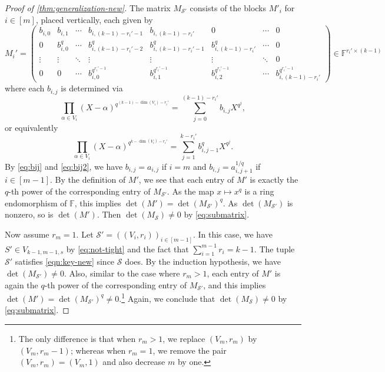 \documentclass[11pt]{article}
\theoremstyle{plain}
\theoremstyle{definition}
\theoremstyle{remark}
\newcommand{\F}{\mathbb{F}}
\newcommand{\cS}{\mathcal{S}}
\begin{document}
\begin{proof}[Proof of \cref{thm:generalization-new}]
The matrix $M_{\cS'}$ consists of the blocks $M'_i$ for $i\in [m]$, placed vertically, each given by
\[
M_i'=\begin{pmatrix}
b_{i,0}&b_{i,1}&\cdots& b_{i,(k-1)-r_i'-1} & b_{i,(k-1)-r_i'}&  0 & \cdots &0   \\
0 &b_{i,0}^q& \cdots  & b_{i,(k-1)-r_i'-2}^q & b_{i,(k-1)-r_i'-1}^q & b_{i,(k-1)-r_i'}^q & \cdots &0 \\
\vdots & \vdots &\ddots & \vdots &\vdots &\vdots& \ddots &0\\
0 &0  & \cdots &b_{i,0}^{q^{r_i'-1}} & b_{i,1}^{q^{r_i'-1}} & b_{i,2}^{q^{r_i'-1}} &\cdots & b_{i,(k-1)-r_i'}^{q^{r_i'-1}} 
\end{pmatrix}\in\mathbb{F}^{r_i'\times (k-1)}
\]
where each $b_{i,j}$ is determined via 
\begin{equation}\label{eq:bij}
\prod_{\alpha\in V_i}(X-\alpha)^{q^{(k-1)-\dim(V_i)-r_i'}}=\sum_{j=0}^{(k-1)-r_i'}b_{i,j} X^{q^j},
\end{equation}
or equivalently
\begin{equation}\label{eq:bij2}
\prod_{\alpha\in V_i}(X-\alpha)^{q^{k-\dim(V_i)-r_i'}}=\sum_{j=1}^{k-r_i'}b_{i,j-1}^q X^{q^j}.
\end{equation}
By \eqref{eq:bij} and \eqref{eq:bij2}, we have $b_{i,j}=a_{i,j}$ if $i=m$ and $b_{i,j}=a_{i,j+1}^{1/q}$ if $i\in [m-1]$. By the definition of $M'$, we see that each entry of $M'$ is exactly the $q$-th power of the corresponding entry of $M_{\cS'}$. As the map $x\mapsto x^q$ is a ring endomorphism of $\F$, this implies $\det(M')=\det(M_{\cS'})^q$.
As $\det(M_{\cS'})$ is nonzero, so is $\det(M')$.
Then $\det(M_{\cS})\neq 0$ by \eqref{eq:submatrix}.




Now assume $r_m=1$. Let $\cS'=((V_i, r_i))_{i\in [m-1]}$. In this case, we have $S'\in V_{k-1,m-1,s}$ by \eqref{eq:not-tight} and the fact that $\sum_{i=1}^{m-1} r_i=k-1$. 
The tuple $\cS'$ satisfies \eqref{eqn:key-new} since $\cS$ does. By the induction hypothesis, we have $\det(M_{\cS'})\neq 0$.
Also, similar to the case where $r_m>1$, each entry of $M'$ is again the $q$-th power of the corresponding entry of $M_{\cS'}$, and this implies $\det(M')=\det(M_{\cS'})^q\neq 0$.\footnote{The only difference is that when $r_m>1$, we replace $(V_m, r_m)$ by $(V_m, r_m-1)$; whereas when $r_m=1$, we remove the pair $(V_m, r_m)=(V_m,1)$ and also decrease $m$ by one.}
Again, we conclude that $\det(M_{\cS})\neq 0$ by \eqref{eq:submatrix}.


\end{proof}
\end{document}
